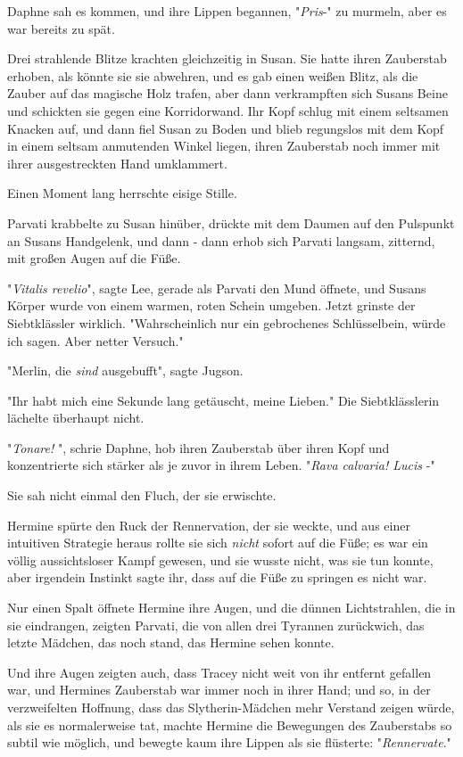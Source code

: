 {Daphne sah es kommen, und ihre Lippen begannen, "\emph{Pris}-" zu murmeln, aber es war bereits zu spät.

Drei strahlende Blitze krachten gleichzeitig in Susan. Sie hatte ihren Zauberstab erhoben, als könnte sie sie abwehren, und es gab einen weißen Blitz, als die Zauber auf das magische Holz trafen, aber dann verkrampften sich Susans Beine und schickten sie gegen eine Korridorwand. Ihr Kopf schlug mit einem seltsamen Knacken auf, und dann fiel Susan zu Boden und blieb regungslos mit dem Kopf in einem seltsam anmutenden Winkel liegen, ihren Zauberstab noch immer mit ihrer ausgestreckten Hand umklammert.

Einen Moment lang herrschte eisige Stille.

Parvati krabbelte zu Susan hinüber, drückte mit dem Daumen auf den Pulspunkt an Susans Handgelenk, und dann - dann erhob sich Parvati langsam, zitternd, mit großen Augen auf die Füße.

"\emph{Vitalis revelio}", sagte Lee, gerade als Parvati den Mund öffnete, und Susans Körper wurde von einem warmen, roten Schein umgeben. Jetzt grinste der Siebtklässler wirklich. "Wahrscheinlich nur ein gebrochenes Schlüsselbein, würde ich sagen. Aber netter Versuch."

"Merlin, die \emph{sind} ausgebufft", sagte Jugson.

"Ihr habt mich eine Sekunde lang getäuscht, meine Lieben." Die Siebtklässlerin lächelte überhaupt nicht.

"\emph{Tonare!} ", schrie Daphne, hob ihren Zauberstab über ihren Kopf und konzentrierte sich stärker als je zuvor in ihrem Leben. "\emph{Rava calvaria! Lucis} -"

Sie sah nicht einmal den Fluch, der sie erwischte.

Hermine spürte den Ruck der Rennervation, der sie weckte, und aus einer intuitiven Strategie heraus rollte sie sich \emph{nicht} sofort auf die Füße; es war ein völlig aussichtsloser Kampf gewesen, und sie wusste nicht, was sie tun konnte, aber irgendein Instinkt sagte ihr, dass auf die Füße zu springen es nicht war.

Nur einen Spalt öffnete Hermine ihre Augen, und die dünnen Lichtstrahlen, die in sie eindrangen, zeigten Parvati, die von allen drei Tyrannen zurückwich, das letzte Mädchen, das noch stand, das Hermine sehen konnte.

Und ihre Augen zeigten auch, dass Tracey nicht weit von ihr entfernt gefallen war, und Hermines Zauberstab war immer noch in ihrer Hand; und so, in der verzweifelten Hoffnung, dass das Slytherin-Mädchen mehr Verstand zeigen würde, als sie es normalerweise tat, machte Hermine die Bewegungen des Zauberstabs so subtil wie möglich, und bewegte kaum ihre Lippen als sie flüsterte: "\emph{Rennervate}."

}

